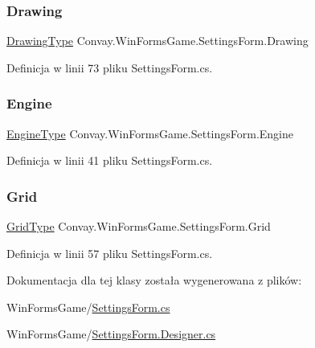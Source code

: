 \subsubsection{\texorpdfstring{Drawing}{Drawing}}
{\footnotesize\ttfamily \hyperlink{class_convay_1_1_win_forms_game_1_1_settings_form_a7918e2a1b1587472aa065d4db7a13537}{Drawing\+Type} Convay.\+Win\+Forms\+Game.\+Settings\+Form.\+Drawing\hspace{0.3cm}{\ttfamily [get]}}



Definicja w linii 73 pliku Settings\+Form.\+cs.

\hypertarget{class_convay_1_1_win_forms_game_1_1_settings_form_aad52f40495b9d8607969abc2ee58c957}{}\label{class_convay_1_1_win_forms_game_1_1_settings_form_aad52f40495b9d8607969abc2ee58c957} 
\subsubsection{\texorpdfstring{Engine}{Engine}}
{\footnotesize\ttfamily \hyperlink{class_convay_1_1_win_forms_game_1_1_settings_form_a37834e752cfe1f75738c237dd98d3d45}{Engine\+Type} Convay.\+Win\+Forms\+Game.\+Settings\+Form.\+Engine\hspace{0.3cm}{\ttfamily [get]}}



Definicja w linii 41 pliku Settings\+Form.\+cs.

\hypertarget{class_convay_1_1_win_forms_game_1_1_settings_form_a21206ca71b836cbf292866fc13eb85f4}{}\label{class_convay_1_1_win_forms_game_1_1_settings_form_a21206ca71b836cbf292866fc13eb85f4} 
\subsubsection{\texorpdfstring{Grid}{Grid}}
{\footnotesize\ttfamily \hyperlink{class_convay_1_1_win_forms_game_1_1_settings_form_a4226b510bf8cf0a0f4fc5bc2e9c334a6}{Grid\+Type} Convay.\+Win\+Forms\+Game.\+Settings\+Form.\+Grid\hspace{0.3cm}{\ttfamily [get]}}



Definicja w linii 57 pliku Settings\+Form.\+cs.



Dokumentacja dla tej klasy została wygenerowana z plików\+:\begin{DoxyCompactItemize}
\item 
Win\+Forms\+Game/\hyperlink{_settings_form_8cs}{Settings\+Form.\+cs}\item 
Win\+Forms\+Game/\hyperlink{_settings_form_8_designer_8cs}{Settings\+Form.\+Designer.\+cs}\end{DoxyCompactItemize}
